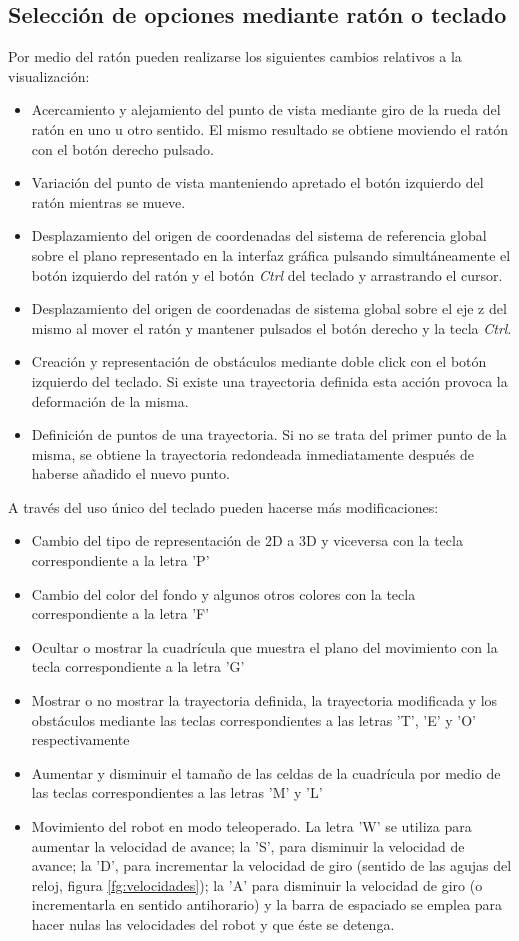 \subsection{Selección de opciones mediante ratón o teclado} \label{opciones}
Por medio del ratón pueden realizarse los siguientes cambios relativos a la visualización:
\begin{itemize}
  \item Acercamiento y alejamiento del punto de vista mediante giro de la rueda del ratón en uno u otro sentido. El mismo resultado se obtiene moviendo el ratón con el botón derecho pulsado.
  \item Variación del punto de vista manteniendo apretado el botón izquierdo del ratón mientras se mueve.
  \item Desplazamiento del origen de coordenadas del sistema de referencia global sobre el plano representado en la interfaz gráfica pulsando simultáneamente el botón izquierdo del ratón y el botón \emph{Ctrl} del teclado y arrastrando el cursor.
  \item Desplazamiento del origen de coordenadas de sistema global sobre el eje z del mismo al mover el ratón y mantener pulsados el botón derecho y la tecla \emph{Ctrl}.
  \item Creación y representación de obstáculos mediante doble click con el botón izquierdo del teclado. Si existe una trayectoria definida esta acción provoca la deformación de la misma.
  \item Definición de puntos de una trayectoria. Si no se trata del primer punto de la misma, se obtiene la trayectoria redondeada inmediatamente después de haberse añadido el nuevo punto.
\end{itemize}

A través del uso único del teclado pueden hacerse más modificaciones:
\begin{itemize}
  \item Cambio del tipo de representación de 2D a 3D y viceversa con la tecla correspondiente a la letra 'P'
  \item Cambio del color del fondo y algunos otros colores con la tecla correspondiente a la letra 'F'
  \item Ocultar o mostrar la cuadrícula que muestra el plano del movimiento con la tecla correspondiente a la letra 'G'
  \item Mostrar o no mostrar la trayectoria definida, la trayectoria modificada y los obstáculos mediante las teclas correspondientes a las letras 'T', 'E' y 'O' respectivamente
  \item Aumentar y disminuir el tamaño de las celdas de la cuadrícula por medio de las teclas correspondientes a las letras 'M' y 'L'
  \item Movimiento del robot en modo teleoperado. La letra 'W' se utiliza para aumentar la velocidad de avance; la 'S', para disminuir la velocidad de avance; la 'D', para incrementar la velocidad de giro (sentido de las agujas del reloj, figura \ref{fg:velocidades}); la 'A' para disminuir la velocidad de giro (o incrementarla en sentido antihorario) y la barra de espaciado se emplea para hacer nulas las velocidades del robot y que éste se detenga.
\end{itemize}

